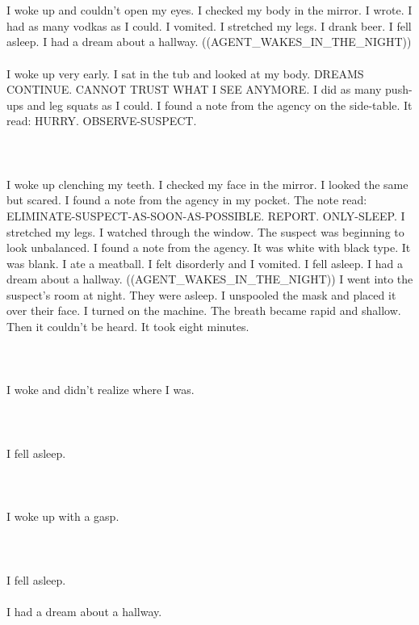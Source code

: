 \documentclass{article}
\begin{document}
    \section{}
    I woke up and couldn't open my eyes. I checked my body in the mirror. I wrote. I had as many vodkas as I could. I vomited. I stretched my legs. I drank beer. I fell asleep. I had a dream about a hallway. ((AGENT_WAKES_IN_THE_NIGHT)) \\\\I woke up very early. I sat in the tub and looked at my body. DREAMS CONTINUE. CANNOT TRUST WHAT I SEE ANYMORE. I did as many push-ups and leg squats as I could. I found a note from the agency on the side-table. It read: HURRY. OBSERVE-SUSPECT. \\\\
    \newpage
    
    \section{}
    I woke up clenching my teeth. I checked my face in the mirror. I looked the same but scared. I found a note from the agency in my pocket. The note read: ELIMINATE-SUSPECT-AS-SOON-AS-POSSIBLE. REPORT. ONLY-SLEEP. I stretched my legs. I watched through the window. The suspect was beginning to look unbalanced. I found a note from the agency. It was white with black type. It was blank. I ate a meatball. I felt disorderly and I vomited. I fell asleep. I had a dream about a hallway. ((AGENT_WAKES_IN_THE_NIGHT)) I went into the suspect's room at night. They were asleep. I unspooled the mask and placed it over their face. I turned on the machine. The breath became rapid and shallow. Then it couldn't be heard. It took eight minutes. \\\\
    \newpage
    
    \section{}
    I woke and didn't realize where I was.\\\\ 
    \newpage
    
    \section{}
    I fell asleep.\\\\ 
    \newpage
    
    \section{}
    I woke up with a gasp.\\\\ 
    \newpage
    
    \section{}
    I fell asleep.\\\\I had a dream about a hallway.\\\\ 
    \newpage
    
    
\end{document}
